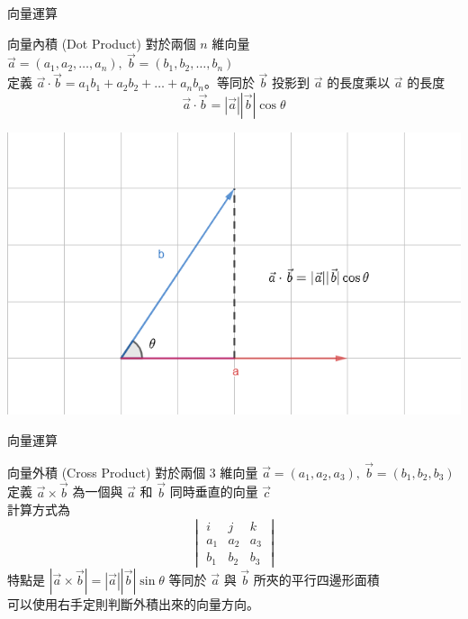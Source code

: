 \documentclass[aspectratio=169]{beamer}
\begin{document}
\begin{frame}{向量運算}
    \begin{alertblock}{向量內積 (Dot Product)}
        對於兩個 $n$ 維向量 $\vec a = (a_1,a_2,\dots,a_n), \ \vec b = (b_1,b_2, \dots, b_n)$ \\
        \vspace{2.5mm}
        定義 $\vec a \cdot \vec b = a_1b_1+a_2b_2+\dots+a_nb_n$。等同於 $\vec b$ 投影到 $\vec a$ 的長度乘以 $\vec a$ 的長度 \\
        \vspace{2.5mm}
        $$\vec a \cdot \vec b = |\vec a| |\vec b| \cos \theta$$
    \end{alertblock}
    \begin{center}
        \includegraphics[scale=0.3]{images/dot_product.png}
    \end{center}
\end{frame}

\begin{frame}{向量運算}
    \begin{alertblock}{向量外積 (Cross Product)}
        對於兩個 $3$ 維向量 $\vec a = (a_1,a_2,a_3), \ \vec b = (b_1,b_2,b_3)$ \\
        \vspace{2.5mm}
        定義 $\vec a \times \vec b$ 為一個與 $\vec a$ 和 $\vec b$ 同時垂直的向量 $\vec c$ \\
        \vspace{2.5mm}
        計算方式為
        $$\begin{vmatrix} i & j & k \\ a_1 & a_2 & a_3 \\ b_1 & b_2 & b_3 \end{vmatrix}$$
        特點是 $|\vec a \times \vec b| = |\vec a| |\vec b| \sin \theta$ 等同於 $\vec a$ 與 $\vec b$ 所夾的平行四邊形面積 \\
        \vspace{2.5mm}
        可以使用右手定則判斷外積出來的向量方向。
    \end{alertblock}
\end{frame}
\end{document}
